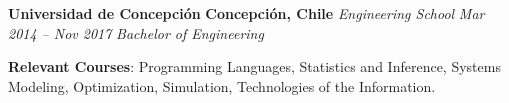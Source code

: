 \item
\headerrow
{\textbf{Universidad de Concepción}}
{\textbf{Concepción, Chile}}
\headerrow
{\emph{Engineering School}}
{\emph{Mar 2014 -- Nov 2017}}
{\emph{Bachelor of Engineering}}
\begin{itemize*}
    \item \textbf{Relevant Courses}: Programming Languages, Statistics and
    Inference, Systems Modeling, Optimization, Simulation, Technologies
    of the Information.
\end{itemize*}